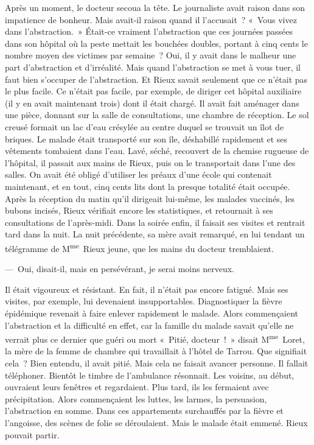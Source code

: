 \documentclass[french,twoside]{book} %
\begin{document}
Après un moment, le docteur secoua la tête. Le journaliste avait raison dans son impatience de bonheur. Mais avait-il raison quand il l’accusait ? « Vous vivez dans l’abstraction. » Était-ce vraiment l’abstraction que ces journées passées dans son hôpital où la peste mettait les bouchées doubles, portant à cinq cents le nombre moyen des victimes par semaine ? Oui, il y avait dans le malheur une part d’abstraction et d’irréalité. Mais quand l’abstraction se met à vous tuer, il faut bien s’occuper de l’abstraction. Et Rieux savait seulement que ce n’était pas le plus facile. Ce n’était pas facile, par exemple, de diriger cet hôpital auxiliaire (il y en avait maintenant trois) dont il était chargé. Il avait fait aménager dans une pièce, donnant sur la salle de consultations, une chambre de réception. Le sol creusé formait un lac d’eau crésylée au centre duquel se trouvait un îlot de briques. Le malade était transporté sur son île, déshabillé rapidement et ses vêtements tombaient dans l’eau. Lavé, séché, recouvert de la chemise rugueuse de l’hôpital, il passait aux mains de Rieux, puis on le transportait dans l’une des salles. On avait été obligé d’utiliser les préaux d’une école qui contenait maintenant, et en tout, cinq cents lits dont la presque totalité était occupée. Après la réception du matin qu’il dirigeait lui-même, les malades vaccinés, les bubons incisés, Rieux vérifiait encore les statistiques, et retournait à ses consultations de l’après-midi. Dans la soirée enfin, il faisait ses visites et rentrait tard dans la nuit. La nuit précédente, sa mère avait remarqué, en lui tendant un télégramme de M\textsuperscript{me} Rieux jeune, que les mains du docteur tremblaient.\par
— Oui, disait-il, mais en persévérant, je serai moins nerveux.\par
Il était vigoureux et résistant. En fait, il n’était pas encore fatigué. Mais ses visites, par exemple, lui devenaient insupportables. Diagnostiquer la fièvre épidémique revenait à faire enlever rapidement le malade. Alors commençaient l’abstraction et la difficulté en effet, car la famille du malade savait qu’elle ne verrait plus ce dernier que guéri ou mort « Pitié, docteur ! » disait M\textsuperscript{me} Loret, la mère de la femme de chambre qui travaillait à l’hôtel de Tarrou. Que signifiait cela ? Bien entendu, il avait pitié. Mais cela ne faisait avancer personne. Il fallait téléphoner. Bientôt le timbre de l’ambulance résonnait. Les voisins, au début, ouvraient leurs fenêtres et regardaient. Plus tard, ils les fermaient avec précipitation. Alors commençaient les luttes, les larmes, la persuasion, l’abstraction en somme. Dans ces appartements surchauffés par la fièvre et l’angoisse, des scènes de folie se déroulaient. Mais le malade était emmené. Rieux pouvait partir.\par
\end{document}
